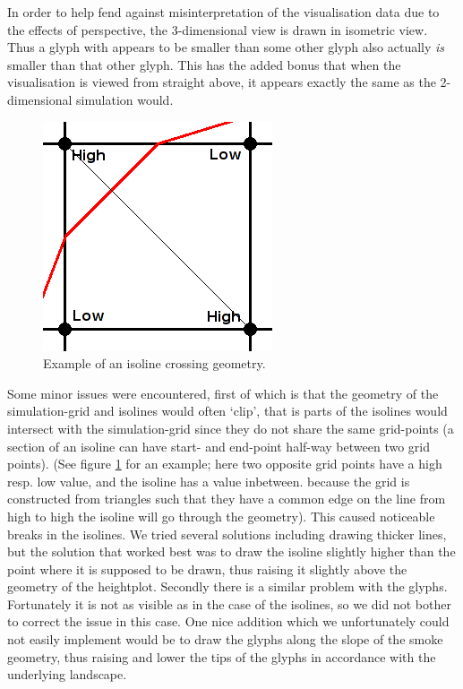 \documentclass[a4paper,11pt,twoside]{report}
\begin{document}
		In order to help fend against misinterpretation of the visualisation data due to the effects of perspective, the 3-dimensional view is drawn in isometric view. Thus a glyph with appears to be smaller than some other glyph also actually \emph{is} smaller than that other glyph. This has the added bonus that when the visualisation is viewed from straight above, it appears exactly the same as the 2-dimensional simulation would.
		\begin{figure}[H]
		\centering
		\includegraphics[scale=\imagescalefactor]{images/isolinetrouble.png}
		\caption{Example of an isoline crossing geometry.}\label{fig:isolinetrouble}
		\end{figure}
		Some minor issues were encountered, first of which is that the geometry of the simulation-grid and isolines would often `clip', that is parts of the isolines would intersect with the simulation-grid since they do not share the same grid-points (a section of an isoline can have start- and end-point half-way between two grid points). (See figure \ref{fig:isolinetrouble} for an example; here two opposite grid points have a high resp. low value, and the isoline has a value inbetween. because the grid is constructed from triangles such that they have a common edge on the line from high to high the isoline will go through the geometry). This caused noticeable breaks in the isolines. We tried several solutions including drawing thicker lines, but the solution that worked best was to draw the isoline slightly higher than the point where it is supposed to be drawn, thus raising it slightly above the geometry of the heightplot.
		Secondly there is a similar problem with the glyphs. Fortunately it is not as visible as in the case of the isolines, so we did not bother to correct the issue in this case. One nice addition which we unfortunately could not easily implement would be to draw the glyphs along the slope of the smoke geometry, thus raising and lower the tips of the glyphs in accordance with the underlying landscape.
\end{document}
